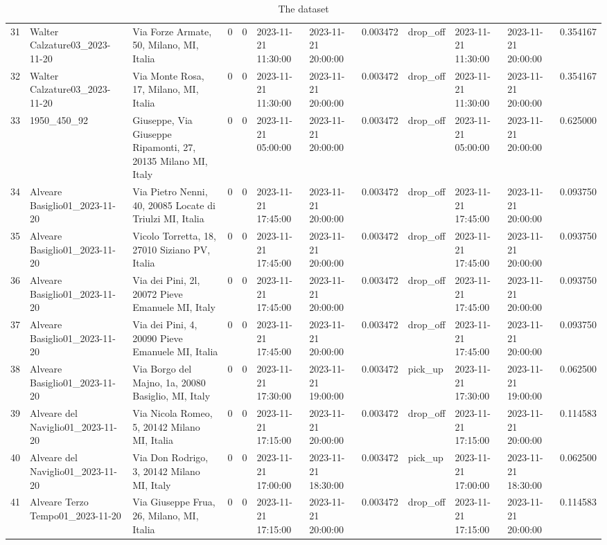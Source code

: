 \documentclass[titlepage]{article}
\begin{document}
\begin{table}[H]
\begin{adjustbox}{max width=\textwidth}
\begin{tabular}{rllrrllrlllr}
31 & Walter Calzature03\_2023-11-20 & Via Forze Armate, 50, Milano, MI, Italia & 0 & 0 & 2023-11-21 11:30:00 & 2023-11-21 20:00:00 & 0.003472 & drop\_off & 2023-11-21 11:30:00 & 2023-11-21 20:00:00 & 0.354167 \\
32 & Walter Calzature03\_2023-11-20 & Via Monte Rosa, 17, Milano, MI, Italia & 0 & 0 & 2023-11-21 11:30:00 & 2023-11-21 20:00:00 & 0.003472 & drop\_off & 2023-11-21 11:30:00 & 2023-11-21 20:00:00 & 0.354167 \\
33 & 1950\_450\_92 & Giuseppe, Via Giuseppe Ripamonti, 27, 20135 Milano MI, Italy & 0 & 0 & 2023-11-21 05:00:00 & 2023-11-21 20:00:00 & 0.003472 & drop\_off & 2023-11-21 05:00:00 & 2023-11-21 20:00:00 & 0.625000 \\
34 & Alveare Basiglio01\_2023-11-20 & Via Pietro Nenni, 40, 20085 Locate di Triulzi MI, Italia & 0 & 0 & 2023-11-21 17:45:00 & 2023-11-21 20:00:00 & 0.003472 & drop\_off & 2023-11-21 17:45:00 & 2023-11-21 20:00:00 & 0.093750 \\
35 & Alveare Basiglio01\_2023-11-20 & Vicolo Torretta, 18, 27010 Siziano PV, Italia & 0 & 0 & 2023-11-21 17:45:00 & 2023-11-21 20:00:00 & 0.003472 & drop\_off & 2023-11-21 17:45:00 & 2023-11-21 20:00:00 & 0.093750 \\
36 & Alveare Basiglio01\_2023-11-20 & Via dei Pini, 2l, 20072 Pieve Emanuele MI, Italy & 0 & 0 & 2023-11-21 17:45:00 & 2023-11-21 20:00:00 & 0.003472 & drop\_off & 2023-11-21 17:45:00 & 2023-11-21 20:00:00 & 0.093750 \\
37 & Alveare Basiglio01\_2023-11-20 & Via dei Pini, 4, 20090 Pieve Emanuele MI, Italia & 0 & 0 & 2023-11-21 17:45:00 & 2023-11-21 20:00:00 & 0.003472 & drop\_off & 2023-11-21 17:45:00 & 2023-11-21 20:00:00 & 0.093750 \\
38 & Alveare Basiglio01\_2023-11-20 & Via Borgo del Majno, 1a, 20080 Basiglio, MI, Italy & 0 & 0 & 2023-11-21 17:30:00 & 2023-11-21 19:00:00 & 0.003472 & pick\_up & 2023-11-21 17:30:00 & 2023-11-21 19:00:00 & 0.062500 \\
39 & Alveare del Naviglio01\_2023-11-20 & Via Nicola Romeo, 5, 20142 Milano MI, Italia & 0 & 0 & 2023-11-21 17:15:00 & 2023-11-21 20:00:00 & 0.003472 & drop\_off & 2023-11-21 17:15:00 & 2023-11-21 20:00:00 & 0.114583 \\
40 & Alveare del Naviglio01\_2023-11-20 & Via Don Rodrigo, 3, 20142 Milano MI, Italy & 0 & 0 & 2023-11-21 17:00:00 & 2023-11-21 18:30:00 & 0.003472 & pick\_up & 2023-11-21 17:00:00 & 2023-11-21 18:30:00 & 0.062500 \\
41 & Alveare Terzo Tempo01\_2023-11-20 & Via Giuseppe Frua, 26, Milano, MI, Italia & 0 & 0 & 2023-11-21 17:15:00 & 2023-11-21 20:00:00 & 0.003472 & drop\_off & 2023-11-21 17:15:00 & 2023-11-21 20:00:00 & 0.114583 \\
\bottomrule
\end{tabular}
\end{adjustbox}
\caption{The dataset}
\label{tab:case_study}
\end{table}
\end{document}
